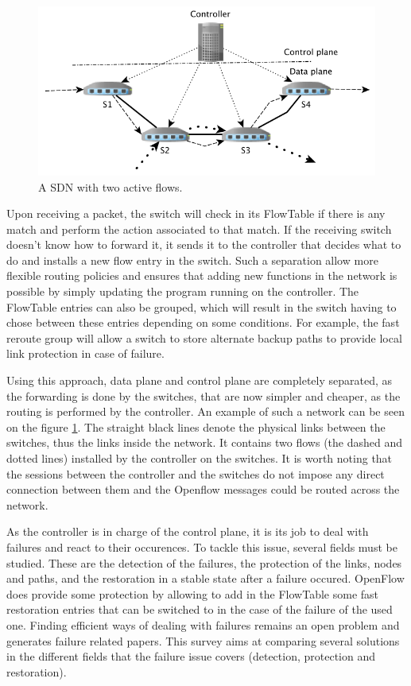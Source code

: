 \documentclass[]{IEEEtran}
\begin{document}
\begin{figure}
	\includegraphics[width=.53\textwidth]{images/sdn.png}
	\caption{A SDN with two active flows.}
	\label{fig:sdn}
\end{figure}

Upon receiving a packet, the switch will check in its FlowTable if there is any match and perform the action associated to that match. If the receiving switch doesn't know how to forward it, it sends it to the controller that decides what to do and installs a new flow entry in the switch. Such a separation allow more flexible routing policies and ensures that adding new functions in the network is possible by simply updating the program running on the controller. The FlowTable entries can also be grouped, which will result in the switch having to chose between these entries depending on some conditions. For example, the fast reroute group will allow a switch to store alternate backup paths to provide local link protection in case of failure.

Using this approach, data plane and control plane are completely separated, as the forwarding is done by the switches, that are now simpler and cheaper, as the routing is performed by the controller. An example of such a network can be seen on the figure \ref{fig:sdn}. The straight black lines denote the physical links between the switches, thus the links inside the network. It contains two flows (the dashed and dotted lines) installed by the controller on the switches. It is worth noting that the sessions between the controller and the switches do not impose any direct connection between them and the Openflow messages could be routed across the network.

As the controller is in charge of the control plane, it is its job to deal with failures and react to their occurences. To tackle this issue, several fields must be studied. These are the detection of the failures, the protection of the links, nodes and paths, and the restoration in a stable state after a failure occured. OpenFlow does provide some protection by allowing to add in the FlowTable some fast restoration entries that can be switched to in the case of the failure of the used one. Finding efficient ways of dealing with failures remains an open problem and generates failure related papers. This survey aims at comparing several solutions in the different fields that the failure issue covers (detection, protection and restoration).
\end{document}
